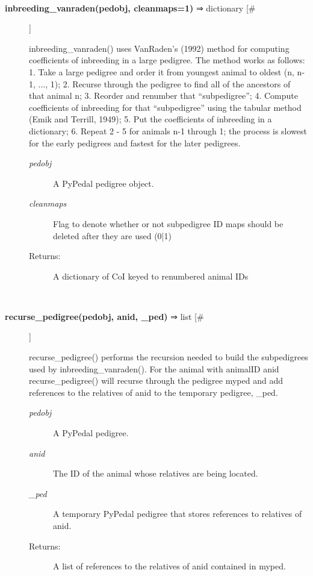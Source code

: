 \documentclass[10pt]{article}
\begin{document}
\begin{description}
\begin{description}
\end{description}
\\ 

\item[\textbf{inbreeding\_vanraden(pedobj, cleanmaps=1)}
 ⇒ dictionary [\#]]

 inbreeding\_vanraden() uses VanRaden's (1992) method for computing coefficients of inbreeding in a large pedigree. The method works as follows: 1. Take a large pedigree and order it from youngest animal to oldest (n, n-1, ..., 1); 2. Recurse through the pedigree to find all of the ancestors of that animal n; 3. Reorder and renumber that ``subpedigree''; 4. Compute coefficients of inbreeding for that ``subpedigree'' using the tabular method (Emik and Terrill, 1949); 5. Put the coefficients of inbreeding in a dictionary; 6. Repeat 2 - 5 for animals n-1 through 1; the process is slowest for the early pedigrees and fastest for the later pedigrees.
\begin{description}
\item[\emph{pedobj}
] A PyPedal pedigree object.
\item[\emph{cleanmaps}
] Flag to denote whether or not subpedigree ID maps should be deleted after they are used (0|1)
\item[Returns:] A dictionary of CoI keyed to renumbered animal IDs

\end{description}
\\ 

\item[\textbf{recurse\_pedigree(pedobj, anid, \_ped)}
 ⇒ list [\#]]

 recurse\_pedigree() performs the recursion needed to build the subpedigrees used by inbreeding\_vanraden(). For the animal with animalID anid recurse\_pedigree() will recurse through the pedigree myped and add references to the relatives of anid to the temporary pedigree, \_ped.
\begin{description}
\item[\emph{pedobj}
] A PyPedal pedigree.
\item[\emph{anid}
] The ID of the animal whose relatives are being located.
\item[\emph{\_ped}
] A temporary PyPedal pedigree that stores references to relatives of anid.
\item[Returns:] A list of references to the relatives of anid contained in myped.

\end{description}
\\ 


\end{description}
\end{document}
